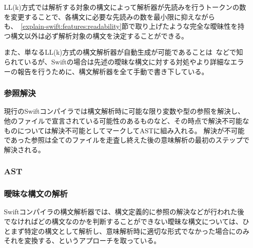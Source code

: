 LL(k)方式では解析する対象の構文によって解析器が先読みを行うトークンの数を変更することで、各構文に必要な先読みの数を最小限に抑えながらも、~\ref{explain-swift:features:readability}節で取り上げたような完全な曖昧性を持つ構文以外は必ず解析対象の構文を決定することができる。

また、単なるLL(k)方式の構文解析器が自動生成が可能であることは~\cite{antlr}などで知られているが、Swiftの場合は先述の曖昧な構文に対する対処やより詳細なエラーの報告を行うために、構文解析器を全て手動で書き下している。

\subsubsection{参照解決}

現行のSwiftコンパイラでは構文解析時に可能な限り変数や型の参照を解決し、他のファイルで宣言されている可能性のあるものなど、その時点で解決不可能なものについては解決不可能としてマークしてASTに組み入れる。
解決が不可能であった参照は全てのファイルを走査し終えた後の意味解析の最初のステップで解決される。


\subsubsection{AST}


\subsubsection{曖昧な構文の解析}

Swiftコンパイラの構文解析器では、構文定義的に参照の解決などが行われた後でなければどの構文なのかを判断することができない曖昧な構文については、ひとまず特定の構文として解析し、意味解析時に適切な形式でなかった場合にのみそれを変換する、というアプローチを取っている。

